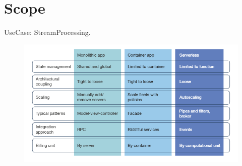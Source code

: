 \section{Scope}

UseCase: StreamProcessing.

\begin{figure}[ht]
    \includegraphics[width=\linewidth]{images/serverless/demyst.png}\centering
    \caption{\cite{Hammond2018DemystifyingComputing}}
\end{figure}